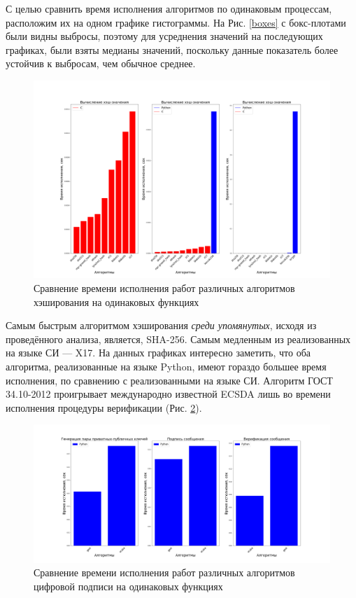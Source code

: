 С целью сравнить время исполнения алгоритмов по одинаковым процессам,
расположим их на одном графике гистограммы.  На Рис. \ref{boxes} с бокс-плотами
были видны выбросы, поэтому для усреднения значений на последующих графиках,
были взяты медианы значений, поскольку данные показатель более устойчив к
выбросам, чем обычное среднее.

\begin{figure}[h!]
    \centering
    \includegraphics[width=\textwidth]{./images/hash_comparison}
    \caption{Сравнение времени исполнения работ различных алгоритмов хэширования на одинаковых функциях}\label{hash_comp}
\end{figure}

Самым быстрым алгоритмом хэширования \emph{среди упомянутых}, исходя из
проведённого анализа, является, SHA-256. Самым медленным из реализованных на
языке СИ --- X17.  На данных графиках интересно заметить, что оба алгоритма,
реализованные на языке Python, имеют гораздо большее время исполнения, по
сравнению с реализованными на языке СИ. Алгоритм ГОСТ 34.10-2012 проигрывает
международно известной ECSDA лишь во времени исполнения процедуры
верификации (Рис. \ref{dss_comp}).

\begin{figure}[h!]
    \centering
    \includegraphics[width=1.\textwidth]{./images/dss_comparison}
    \caption{Сравнение времени исполнения работ различных алгоритмов цифровой подписи на одинаковых функциях}\label{dss_comp}
\end{figure}

